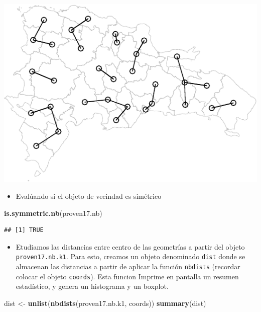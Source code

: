 \documentclass[11pt,]{article}
\newenvironment{Shaded}{\begin{snugshade}}{\end{snugshade}}
\newcommand{\KeywordTok}[1]{\textcolor[rgb]{0.13,0.29,0.53}{\textbf{#1}}}
\newcommand{\StringTok}[1]{\textcolor[rgb]{0.31,0.60,0.02}{#1}}
\newcommand{\NormalTok}[1]{#1}
\providecommand{\tightlist}{%
\setlength{\itemsep}{0pt}\setlength{\parskip}{0pt}}
\begin{document}
\includegraphics{proyecto_files/figure-latex/unnamed-chunk-14-1.pdf}

\begin{itemize}
\tightlist
\item
  Evalúando si el objeto de vecindad es simétrico
\end{itemize}

\begin{Shaded}
\begin{Highlighting}[]
\KeywordTok{is.symmetric.nb}\NormalTok{(proven17.nb)}
\end{Highlighting}
\end{Shaded}

\begin{verbatim}
## [1] TRUE
\end{verbatim}

\begin{itemize}
\tightlist
\item
  Etudiamos las distancias entre centro de las geometrías a partir del
  objeto \texttt{proven17.nb.k1}. Para esto, creamos un objeto
  denominado \texttt{dist} donde se almacenan las distancias a partir de
  aplicar la función \texttt{nbdists} (recordar colocar el objeto
  \texttt{coords}). Esta funcion Imprime en pantalla un resumen
  estadístico, y genera un histograma y un boxplot.
\end{itemize}

\begin{Shaded}
\begin{Highlighting}[]
\NormalTok{dist <-}\StringTok{ }\KeywordTok{unlist}\NormalTok{(}\KeywordTok{nbdists}\NormalTok{(proven17.nb.k1, coords))}
\KeywordTok{summary}\NormalTok{(dist)}
\end{Highlighting}
\end{Shaded}
\end{document}
